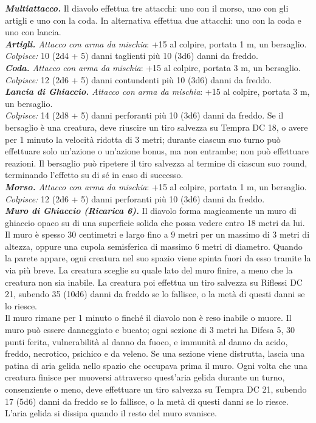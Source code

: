 \begin{multicols}{2}
\emph{\textbf{Multiattacco.}} Il diavolo effettua tre attacchi: uno con
il morso, uno con gli artigli e uno con la coda. In alternativa effettua due attacchi: uno con la coda e uno con lancia.\\
\emph{\textbf{Artigli.} Attacco con arma da mischia}: +15 al colpire, portata 1 m, un bersaglio.\\
\emph{Colpisce:} 10 (2d4 + 5) danni taglienti più 10 (3d6) danni da freddo.\\
\emph{\textbf{Coda.} Attacco con arma da mischia}: +15 al colpire, portata 3 m, un bersaglio.\\
\emph{Colpisce:} 12 (2d6 + 5) danni contundenti più 10 (3d6) danni da freddo.\\
\emph{\textbf{Lancia di Ghiaccio.} Attacco con arma da mischia}: +15 al colpire, portata 3 m, un bersaglio.\\
\emph{Colpisce:} 14 (2d8 + 5) danni perforanti più 10 (3d6) danni da freddo. Se il bersaglio è una creatura, deve riuscire un tiro salvezza su Tempra DC  18, o avere per 1 minuto la velocità ridotta di 3 metri; durante ciascun suo turno può effettuare solo un'azione o un'azione bonus, ma non entrambe; non può effettuare reazioni. Il bersaglio può ripetere il tiro salvezza al termine di ciascun suo round, terminando l'effetto su di sé in caso di successo.\\
\emph{\textbf{Morso.} Attacco con arma da mischia}: +15 al colpire, portata 1 m, un bersaglio.\\
\emph{Colpisce:} 12 (2d6 + 5) danni perforanti più 10 (3d6) danni da freddo.\\
\emph{\textbf{Muro di Ghiaccio (Ricarica 6).}} Il diavolo forma magicamente un muro di ghiaccio opaco su di una superficie solida che possa vedere entro 18 metri da lui. Il muro è spesso 30 centimetri e largo fino a 9 metri per un massimo di 3 metri di altezza, oppure una cupola semisferica di massimo 6 metri di diametro. Quando la parete appare, ogni creatura nel suo spazio viene spinta fuori da esso tramite la via più breve. La creatura sceglie su quale lato del muro finire, a meno che la creatura non sia inabile. La creatura poi effettua un tiro salvezza su Riflessi DC  21, subendo 35 (10d6) danni da freddo se lo fallisce, o la metà di questi danni se lo riesce.\\
Il muro rimane per 1 minuto o finché il diavolo non è reso inabile o muore. Il muro può essere danneggiato e bucato; ogni sezione di 3 metri ha Difesa 5, 30 punti ferita, vulnerabilità al danno da fuoco, e immunità al danno da acido, freddo, necrotico, psichico e da veleno. Se una sezione viene distrutta, lascia una patina di aria gelida nello spazio che occupava prima il muro. Ogni volta che una creatura finisce per muoversi attraverso quest'aria gelida durante un turno, consenziente o meno, deve effettuare un tiro salvezza su Tempra DC  21, subendo 17 (5d6) danni da freddo se lo fallisce, o la metà di questi danni se lo riesce. \\
L'aria gelida si dissipa quando il resto del muro svanisce.\\



\end{multicols}
